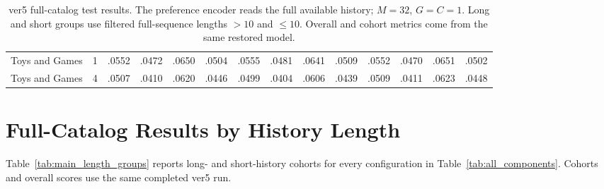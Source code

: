 \documentclass[11pt]{article}
\begin{document}
\begin{table}[!t]
{\begin{tabular}{llrrrrrrrrrrrr}
Toys and Games & 1 & .0552 & .0472 & .0650 & .0504 & .0555 & .0481 & .0641 & .0509 & .0552 & .0470 & .0651 & .0502 \\
Toys and Games & 4 & .0507 & .0410 & .0620 & .0446 & .0499 & .0404 & .0606 & .0439 & .0509 & .0411 & .0623 & .0448 \\
\bottomrule
\end{tabular}%
}
\caption{ver5 full-catalog test results. The preference encoder reads the full available history; $M=32$, $G=C=1$. Long and short groups use filtered full-sequence lengths $>10$ and $\leq10$. Overall and cohort metrics come from the same restored model.}
\label{tab:short_window}
\end{table}

\section{Full-Catalog Results by History Length}
\label{app:full_catalog_groups}
Table~\ref{tab:main_length_groups} reports long- and short-history cohorts for every configuration in Table~\ref{tab:all_components}. Cohorts and overall scores use the same completed ver5 run.
\end{document}
